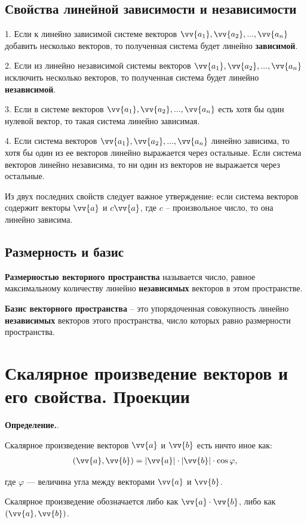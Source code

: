 \documentclass[a4paper,12pt]{extbook}
\newcommand{\newpar}{$ $\par\nobreak\ignorespaces}
\newenvironment{definition}[1][]{\noindent\textbf{Определение.}\if\relax\detokenize{#1}\relax\else\;#1.\newpar\fi\;}{\bigskip}
\theoremstyle{numbered}
\theoremstyle{named}
\theoremstyle{named}
\theoremstyle{named}
\begin{document}
\subsection*{Свойства линейной зависимости и независимости}

1. Если к линейно зависимой системе векторов \(\vv{a_1}, \vv{a_2}, ..., \vv{a_n}\) добавить несколько векторов, то полученная система будет линейно \textbf{зависимой}.

2. Если из линейно независимой системы векторов \(\vv{a_1}, \vv{a_2}, ..., \vv{a_n}\) исключить несколько векторов, то полученная система будет линейно \textbf{независимой}.

3. Если в системе векторов \(\vv{a_1}, \vv{a_2}, ..., \vv{a_n}\) есть хотя бы один нулевой вектор, то такая система линейно зависимая.

4. Если система векторов \(\vv{a_1}, \vv{a_2}, ..., \vv{a_n}\) линейно зависима, то хотя бы один из ее векторов линейно выражается через остальные. Если система векторов линейно независима, то ни один из векторов не выражается через остальные.

Из двух последних свойств следует важное утверждение:
если система векторов содержит векторы \(\vv{a}\) и \(c \vv{a}\), где \(c\) – произвольное число, то она линейно зависима.

\subsection*{Размерность и базис}
\textbf{Размерностью векторного пространства} называется число, равное максимальному количеству линейно \textbf{независимых} векторов в этом пространстве.

\textbf{Базис векторного пространства} – это упорядоченная совокупность линейно \textbf{независимых} векторов этого пространства, число которых равно размерности пространства.

\section{Скалярное произведение векторов и его свойства. Проекции}\label{sec:scalar-multiply}

\begin{definition}
    Скалярное произведение векторов \(\vv{a}\) и \(\vv{b}\) есть ничто иное как:
    \begin{gather*}
        (\vv{a}, \vv{b}) = |\vv{a}| \cdot |\vv{b}| \cdot \cos{\varphi},
    \end{gather*}

    где \(\varphi\) — величина угла между векторами \(\vv{a}\) и \(\vv{b}\).


    Скалярное произведение обозначается либо как \(\vv{a} \cdot \vv{b}\), либо как \((\vv{a}, \vv{b})\).
\end{definition}
\end{document}
